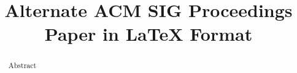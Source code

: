 \documentclass{sig-alternate-05-2015}
\begin{document}



%

\title{Alternate {\ttlit ACM} SIG Proceedings Paper in LaTeX
Format}
%
%
%
%
%

%
\maketitle
\begin{abstract}
Abstract
\end{abstract}


\end{document}
